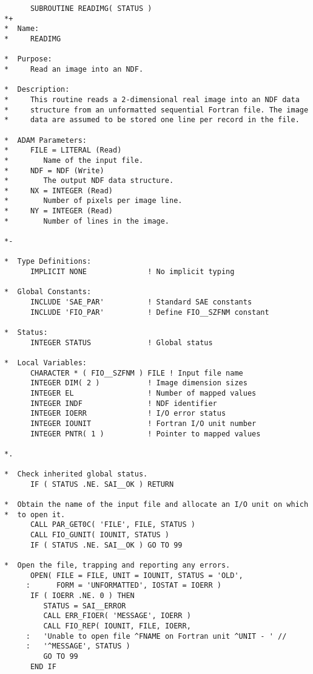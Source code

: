\documentclass[twoside,11pt]{article}
\begin{document}
\small
\begin{verbatim}
      SUBROUTINE READIMG( STATUS )
*+
*  Name:
*     READIMG

*  Purpose:
*     Read an image into an NDF.

*  Description:
*     This routine reads a 2-dimensional real image into an NDF data
*     structure from an unformatted sequential Fortran file. The image
*     data are assumed to be stored one line per record in the file.

*  ADAM Parameters:
*     FILE = LITERAL (Read)
*        Name of the input file.
*     NDF = NDF (Write)
*        The output NDF data structure.
*     NX = INTEGER (Read)
*        Number of pixels per image line.
*     NY = INTEGER (Read)
*        Number of lines in the image.

*-
      
*  Type Definitions:
      IMPLICIT NONE              ! No implicit typing

*  Global Constants:
      INCLUDE 'SAE_PAR'          ! Standard SAE constants
      INCLUDE 'FIO_PAR'          ! Define FIO__SZFNM constant

*  Status:
      INTEGER STATUS             ! Global status

*  Local Variables:
      CHARACTER * ( FIO__SZFNM ) FILE ! Input file name
      INTEGER DIM( 2 )           ! Image dimension sizes
      INTEGER EL                 ! Number of mapped values
      INTEGER INDF               ! NDF identifier
      INTEGER IOERR              ! I/O error status
      INTEGER IOUNIT             ! Fortran I/O unit number
      INTEGER PNTR( 1 )          ! Pointer to mapped values

*.

*  Check inherited global status.
      IF ( STATUS .NE. SAI__OK ) RETURN

*  Obtain the name of the input file and allocate an I/O unit on which
*  to open it.
      CALL PAR_GET0C( 'FILE', FILE, STATUS )
      CALL FIO_GUNIT( IOUNIT, STATUS )
      IF ( STATUS .NE. SAI__OK ) GO TO 99

*  Open the file, trapping and reporting any errors.
      OPEN( FILE = FILE, UNIT = IOUNIT, STATUS = 'OLD',
     :      FORM = 'UNFORMATTED', IOSTAT = IOERR )
      IF ( IOERR .NE. 0 ) THEN
         STATUS = SAI__ERROR
         CALL ERR_FIOER( 'MESSAGE', IOERR )
         CALL FIO_REP( IOUNIT, FILE, IOERR,
     :   'Unable to open file ^FNAME on Fortran unit ^UNIT - ' //
     :   '^MESSAGE', STATUS )
         GO TO 99
      END IF


\end{verbatim}
\end{document}
